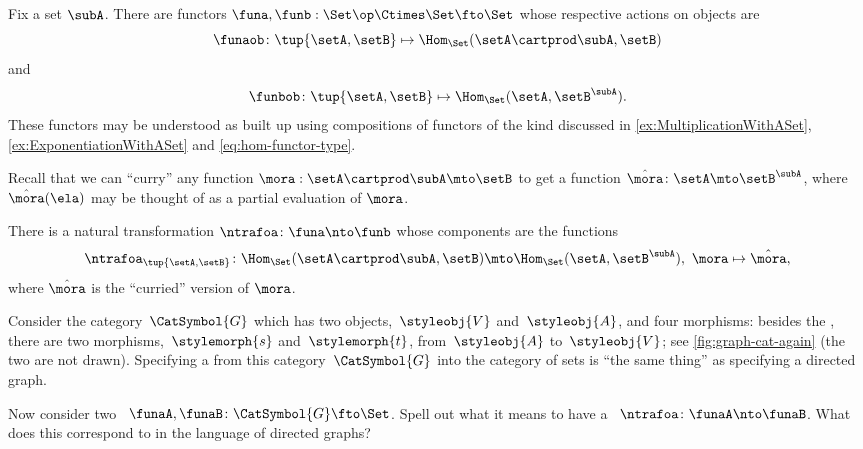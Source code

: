 \begin{example}
    Fix a set $\subA$.
    There are functors $\funa, \funb: \Set\op \Ctimes \Set \fto \Set$ whose respective actions on objects are
    \begin{equation}
        \funaob \colon \tup{\setA, \setB} \mapsto \Hom_\Set(\setA \cartprod \subA, \setB)
    \end{equation}
    and
    \begin{equation}
        \funbob \colon \tup{\setA, \setB} \mapsto \Hom_\Set(\setA, \setB^\subA).
    \end{equation}
    These functors may be understood as built up using compositions of functors of the kind discussed in \cref{ex:MultiplicationWithASet}, \cref{ex:ExponentiationWithASet} and \cref{eq:hom-functor-type}.

    Recall that we can ``curry'' any function $\mora : \setA \cartprod \subA \mto \setB$ to get a function $\hat \mora \colon \setA \mto \setB^\subA$, where $\hat \mora(\ela)$ may be thought of as a partial evaluation of $\mora$.

    There is a natural transformation $\ntrafoa \colon \funa \nto \funb$ whose components are the functions
    \begin{equation}\label{eq:currying-nat-trafo}
        \ntrafoa_{\tup{\setA, \setB}} \colon \Hom_\Set(\setA \cartprod \subA, \setB) \mto \Hom_\Set(\setA, \setB^\subA), \ \mora \mapsto \hat \mora,
    \end{equation}
    where $\hat \mora$ is the ``curried'' version of $\mora$.
\end{example}

\vfill

\begin{marginfigure}
    \centering
    \caption{}
    \label{fig:graph-cat-again}
\end{marginfigure}

\begin{gradedexercise}
    \label{ex:NatTrafosGraphs}
    Consider the category~$\CatSymbol{G}$ which has two objects,~$\styleobj{V}$ and~$\styleobj{A}$, and four morphisms: besides the , there are two morphisms,~$\stylemorph{s}$ and~$\stylemorph{t}$, from~$\styleobj{A}$ to~$\styleobj{V}$; see \cref{fig:graph-cat-again} (the two  are not drawn).
    Specifying a  from this category~$\CatSymbol{G}$ into the category of sets is ``the same thing'' as specifying a directed graph.

    Now consider two ~$\funaA, \funaB \colon \CatSymbol{G} \fto \Set$.
    Spell out what it means to have a ~$\ntrafoa\colon \funaA \nto \funaB$.
    What does this correspond to in the language of directed graphs?
\end{gradedexercise}

